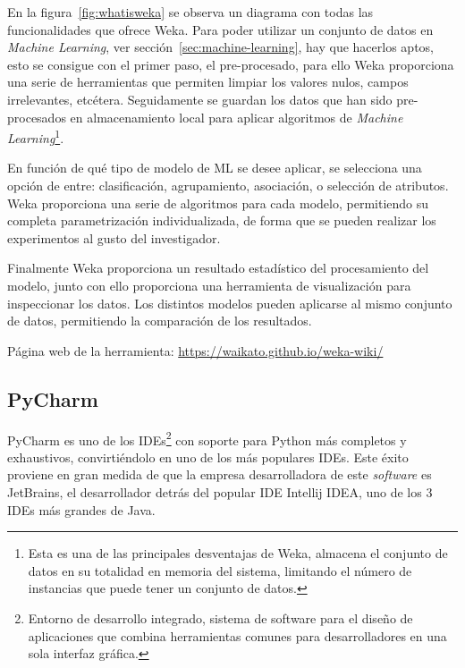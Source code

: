 En la figura~\ref{fig:whatisweka} se observa un diagrama con todas las funcionalidades que ofrece Weka. Para poder utilizar un conjunto de datos en \textit{Machine Learning}, ver sección~\ref{sec:machine-learning}, hay que hacerlos aptos, esto se consigue con el primer paso, el pre-procesado, para ello Weka proporciona una serie de herramientas que permiten limpiar los valores nulos, campos irrelevantes, etcétera. Seguidamente se guardan los datos que han sido pre-procesados en almacenamiento local para aplicar algoritmos de \textit{Machine Learning}\footnote{Esta es una de las principales desventajas de Weka, almacena el conjunto de datos en su totalidad en memoria del sistema, limitando el número de instancias que puede tener un conjunto de datos.}.

En función de qué tipo de modelo de ML se desee aplicar, se selecciona una opción de entre: clasificación, agrupamiento, asociación, o selección de atributos. Weka proporciona una serie de algoritmos para cada modelo, permitiendo su completa parametrización individualizada, de forma que se pueden realizar los experimentos al gusto del investigador. 

Finalmente Weka proporciona un resultado estadístico del procesamiento del modelo, junto con ello proporciona una herramienta de visualización para inspeccionar los datos. Los distintos modelos pueden aplicarse al mismo conjunto de datos, permitiendo la comparación de los resultados.

Página web de la herramienta: \url{https://waikato.github.io/weka-wiki/}

\subsection{PyCharm}

PyCharm es uno de los IDEs\footnote{Entorno de desarrollo integrado, sistema de software para el diseño de aplicaciones que combina herramientas comunes para desarrolladores en una sola interfaz gráfica.} con soporte para Python más completos y exhaustivos, convirtiéndolo en uno de los más populares IDEs. Este éxito proviene en gran medida de que la empresa desarrolladora de este \textit{software} es JetBrains, el desarrollador detrás del popular IDE Intellij IDEA, uno de los 3 IDEs más grandes de Java.

